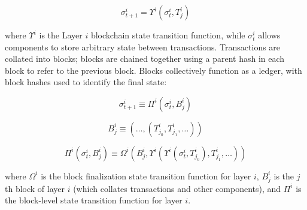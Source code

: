 \documentclass{article}
\newcommand{\block}[2]{B^{#1}_{#2}}
\newcommand{\blockchainstatetransition}[1]{\Upsilon^{i}}
\newcommand{\blockfinalizationstatetransition}[1]{\Omega^#1}
\newcommand{\blockstatetransition}[1]{\Pi^#1}
\newcommand{\statetransition}[2]{\sigma_{#2}^#1}
\newcommand{\transaction}[2]{T_{#2}^#1}
\begin{document}
\begin{equation}
\statetransition{i}{t+1} = \blockchainstatetransition{i}(\statetransition{i}{t}, \transaction{i}{j})
\end{equation}

\noindent where $\blockchainstatetransition{i}$ is the Layer $i$ blockchain state transition function, while $\statetransition{i}{t}$ allows  components to store arbitrary state between transactions.  Transactions are collated into blocks; blocks are chained together using a parent hash in each block to refer to the previous block.  Blocks collectively function as a ledger, with block hashes used to identify the final state:

\begin{equation}
    \statetransition{i}{t+1} \equiv \blockstatetransition{i}(\statetransition{i}{t}, \block{i}{j})
\end{equation}

\begin{equation}
    \block{i}{j} 	\equiv (\ldots, (\transaction{i}{j_0}, \transaction{i}{j_1}, \ldots))
\end{equation}

\begin{equation}
   \blockstatetransition{i}(\statetransition{i}{t}, \block{i}{j}) 	\equiv \blockfinalizationstatetransition{i}(\block{i}{j}, \blockchainstatetransition{i}(\blockchainstatetransition{i}(\statetransition{i}{t}, \transaction{i}{j_0}), \transaction{i}{j_1}, \ldots))
\end{equation}

\noindent where $\blockfinalizationstatetransition{i}$ is the block finalization state transition function for layer $i$, $\block{i}{j}$ is the $j$th block of layer $i$ (which collates transactions and other components), and $\blockstatetransition{i}$ is the block-level state transition function for layer $i$.
\end{document}
